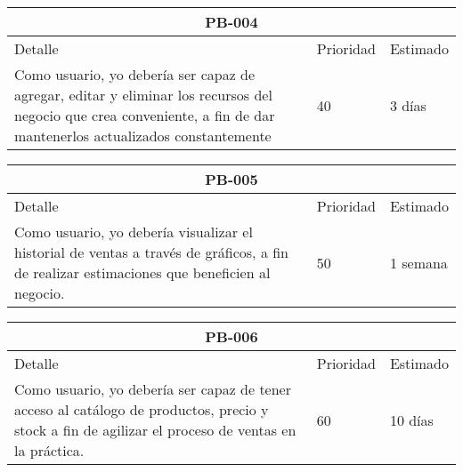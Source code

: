 \begin{table}[htbp]
	\begin{center}
		\begin{tabular}{|p{10cm} | p{2cm} | p{2cm}|}
			\hline
			\multicolumn{3}{|c|}{PB-004}\\
			\hline
			Detalle & Prioridad & Estimado \\
			\hline
			Como usuario, yo debería ser capaz de agregar, editar y eliminar los recursos del negocio que crea conveniente, a fin de dar mantenerlos actualizados constantemente& 40 & 3 días \\
			\hline	
		\end{tabular}
	\end{center}
\end{table}

\begin{table}[htbp]
	\begin{center}
		\begin{tabular}{|p{10cm} | p{2cm} | p{2cm}|}
			\hline
			\multicolumn{3}{|c|}{PB-005}\\
			\hline
			Detalle & Prioridad & Estimado \\
			\hline
			Como usuario, yo debería visualizar el historial de ventas a través de gráficos, a fin de realizar estimaciones que beneficien al negocio. & 50 & 1 semana \\
			\hline	
		\end{tabular}
	\end{center}
\end{table}

\begin{table}[htbp]
	\begin{center}
		\begin{tabular}{|p{10cm} | p{2cm} | p{2cm}|}
			\hline
			\multicolumn{3}{|c|}{PB-006}\\
			\hline
			Detalle & Prioridad & Estimado \\
			\hline
			Como usuario, yo debería ser capaz de tener acceso al catálogo de productos, precio y stock a fin de agilizar el proceso de ventas en la práctica. & 60 & 10 días \\
			\hline	
		\end{tabular}
	\end{center}
\end{table}

